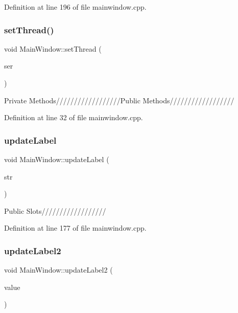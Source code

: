 Definition at line 196 of file mainwindow.\+cpp.

\mbox{\label{class_main_window_a251886b877d475b08cf0291c5529767e}} 
\subsubsection{\texorpdfstring{set\+Thread()}{setThread()}}
{\footnotesize\ttfamily void Main\+Window\+::set\+Thread (\begin{DoxyParamCaption}\item[{\mbox{\hyperlink{class_thread}{Thread}} $\ast$}]{ser }\end{DoxyParamCaption})}

Private Methods//////////////////\+Public Methods////////////////// 

Definition at line 32 of file mainwindow.\+cpp.

\mbox{\label{class_main_window_ae0210b36ab2d1cce80443e36942e4ac7}} 
\subsubsection{\texorpdfstring{update\+Label}{updateLabel}}
{\footnotesize\ttfamily void Main\+Window\+::update\+Label (\begin{DoxyParamCaption}\item[{Q\+String}]{str }\end{DoxyParamCaption})\hspace{0.3cm}{\ttfamily [slot]}}

Public Slots////////////////// 

Definition at line 177 of file mainwindow.\+cpp.

\mbox{\label{class_main_window_a315247f5e13a056bb7b0eb9b7a1696a3}} 
\subsubsection{\texorpdfstring{update\+Label2}{updateLabel2}}
{\footnotesize\ttfamily void Main\+Window\+::update\+Label2 (\begin{DoxyParamCaption}\item[{Q\+String}]{value }\end{DoxyParamCaption})\hspace{0.3cm}{\ttfamily [slot]}}



